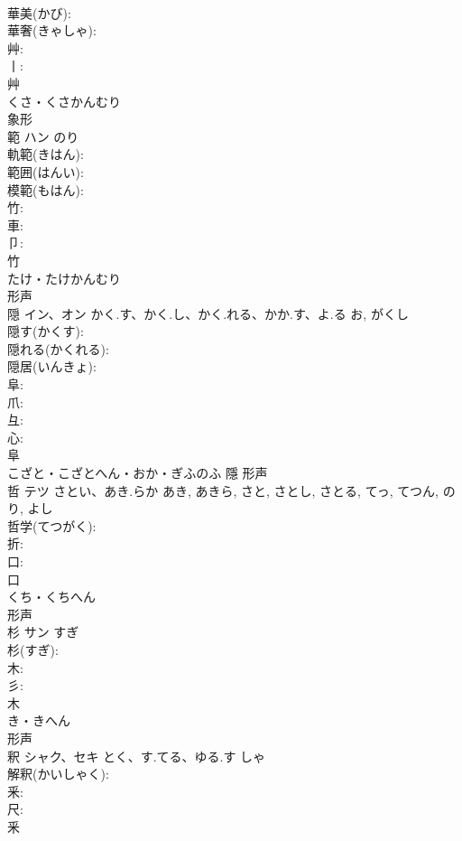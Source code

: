 \documentclass[8pt]{extreport}
\begin{document}
\begin{CJK}{UTF8}{min}
\\	華美(かび): 
\\	華奢(きゃしゃ): 
\\	艸: 
\\	丨: 
\\	艸	
\\	くさ・くさかんむり	
\\	象形 
\\	範	ハン		のり	
\\	軌範(きはん): 
\\	範囲(はんい): 
\\	模範(もはん): 
\\	竹: 
\\	車: 
\\	卩: 
\\	竹	
\\	たけ・たけかんむり	
\\	形声 
\\	隠	イン、オン	かく.す、かく.し、かく.れる、かか.す、よ.る	お, がくし	
\\	隠す(かくす): 
\\	隠れる(かくれる): 
\\	隠居(いんきょ): 
\\	阜: 
\\	爪: 
\\	彑: 
\\	心: 
\\	阜	
\\	こざと・こざとへん・おか・ぎふのふ	隱	形声 
\\	哲	テツ	さとい、あき.らか	あき, あきら, さと, さとし, さとる, てっ, てつん, のり, よし	
\\	哲学(てつがく): 
\\	折: 
\\	口: 
\\	口	
\\	くち・くちへん	
\\	形声 
\\	杉	サン	すぎ		
\\	杉(すぎ): 
\\	木: 
\\	彡: 
\\	木	
\\	き・きへん	
\\	形声 
\\	釈	シャク、セキ	とく、す.てる、ゆる.す	しゃ	
\\	解釈(かいしゃく): 
\\	釆: 
\\	尺: 
\\	釆	

\end{CJK}
\end{document}

